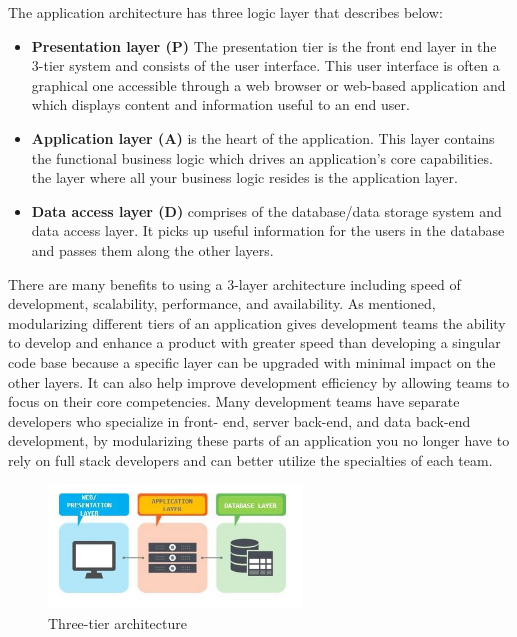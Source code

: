 The application architecture has three logic layer that describes below:
\begin{itemize}
    \item \textbf{Presentation layer (P)} The presentation tier is the front end layer in the 3-tier system and consists of the user interface. This user interface is often a graphical one accessible through a web browser or web-based application and which displays content and information useful to an end user.\\
    
    \item \textbf{Application layer (A)}  is the heart of the application. This layer contains the functional business logic which drives an application’s core capabilities. the layer where all your business logic resides is the application layer.\\
    
    \item \textbf{Data access layer (D)} comprises of the database/data storage system and data access layer. It picks up useful information for the users in the database and passes them along the other layers.\\
\end{itemize}

There are many benefits to using a 3-layer architecture including speed of development, scalability, performance, and availability.  As mentioned, modularizing different tiers of an application gives development teams the ability to develop and enhance a product with greater speed than developing a singular code base because a specific layer can be upgraded with minimal impact on the other layers.  It can also help improve development efficiency by allowing teams to focus on their core competencies. Many development teams have separate developers who specialize in front- end, server back-end, and data back-end development, by modularizing these parts of an application you no longer have to rely on full stack developers and can better utilize the specialties of each team.\\

\begin{figure}[H]
  \centering
  \includegraphics[width=0.6\textwidth,keepaspectratio]{images/all/3tier.jpg}
  \caption{Three-tier architecture}
\end{figure}

